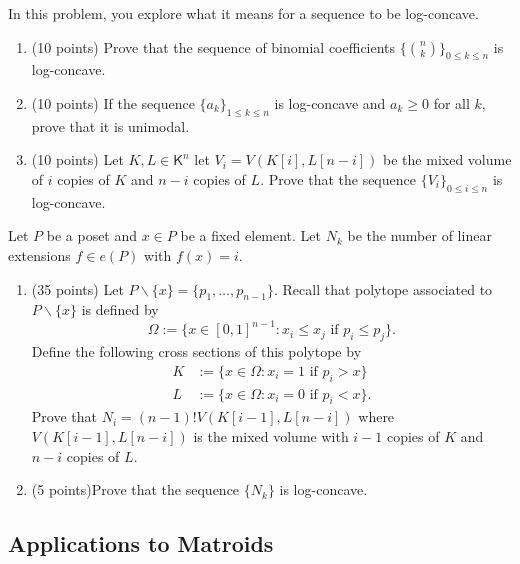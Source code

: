 \documentclass[11pt]{article}
\begin{document}
\begin{prob} [30 points]
    In this problem, you explore what it means for a sequence to be log-concave.
    \begin{enumerate}[label = (\alph*)]
        \item (10 points) Prove that the sequence of binomial coefficients $\{\binom{n}{k}\}_{0 \leq k \leq n}$ is log-concave. 
        \item (10 points) If the sequence $\{a_k\}_{1 \leq k \leq n}$ is log-concave and $a_k \geq 0$ for all $k$, prove that it is unimodal. 
        \item (10 points) Let $K, L \in \mathsf{K}^n$ let $V_i = V(K[i], L[n-i])$ be the mixed volume of $i$ copies of $K$ and $n-i$ copies of $L$. Prove that the sequence $\{V_i\}_{0 \leq i \leq n}$ is log-concave. 
    \end{enumerate}
\end{prob}

\begin{prob} [40 points]
    Let $P$ be a poset and $x \in P$ be a fixed element. Let $N_k$ be the number of linear extensions $f \in e(P)$ with $f(x) = i$. 
    \begin{enumerate}[label = (\alph*)]
        \item (35 points) Let $P \backslash \{x\} = \{p_1, \ldots, p_{n-1}\}$. Recall that polytope associated to $P \backslash \{x\}$ is defined by 
        \[
            \Omega := \{ x \in [0, 1]^{n-1} : x_i \leq x_j \text{ if } p_i \leq p_j \}.    
        \]
        Define the following cross sections of this polytope by 
        \begin{align*}
            K & := \{ x \in \Omega : x_i = 1 \text{ if } p_i > x \} \\
            L & := \{x \in \Omega : x_i = 0 \text{ if } p_i < x \}.
        \end{align*}
        Prove that $N_i = (n-1)! V(K[i-1], L[n-i])$ where $V(K[i-1], L[n-i])$ is the mixed volume with $i-1$ copies of $K$ and $n-i$ copies of $L$. 

        \item (5 points)Prove that the sequence $\{N_k\}$ is log-concave.
    \end{enumerate}
\end{prob}

\subsection{Applications to Matroids} \label{subsection-matroids}
\end{document}

